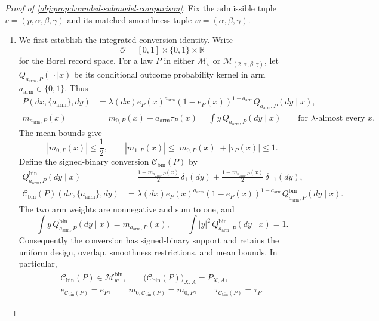 \documentclass[11pt]{article}
\begin{document}
\begin{proof}[Proof of \cref{obj:prop:bounded-submodel-comparison}]
Fix the admissible tuple \(v=(p,\alpha,\beta,\gamma)\) and its matched smoothness tuple \(w=(\alpha,\beta,\gamma)\).

\begin{enumerate}
\item We first establish the integrated conversion identity. Write
\[
\mathcal O=[0,1]\times\{0,1\}\times\mathbb R
\]
for the Borel record space. For a law \(P\) in either
\(\mathcal M_v\) or \(\mathcal M_{(2,\alpha,\beta,\gamma)}\), let
\(Q_{a_{\mathrm{arm}},P}(\,\cdot\mid x)\) be its conditional outcome probability kernel in arm \(a_{\mathrm{arm}}\in\{0,1\}\). Thus
\[
\begin{split}
P(dx,\{a_{\mathrm{arm}}\},dy)
&=\lambda(dx)e_P(x)^{a_{\mathrm{arm}}}
  (1-e_P(x))^{1-a_{\mathrm{arm}}}
  Q_{a_{\mathrm{arm}},P}(dy\mid x),\\
m_{a_{\mathrm{arm}},P}(x)
&=m_{0,P}(x)+a_{\mathrm{arm}}\tau_P(x)
 =\int y\,Q_{a_{\mathrm{arm}},P}(dy\mid x)
 \qquad\text{for \(\lambda\)-almost every \(x\)}.
\end{split}
\]
The mean bounds give
\[
|m_{0,P}(x)|\le\frac12,\qquad
|m_{1,P}(x)|
\le |m_{0,P}(x)|+|\tau_P(x)|\le1.
\]
Define the signed-binary conversion \(\mathcal C_{\mathrm{bin}}(P)\) by
\[
\begin{split}
Q^{\mathrm{bin}}_{a_{\mathrm{arm}},P}(dy\mid x)
&=\frac{1+m_{a_{\mathrm{arm}},P}(x)}2\,\delta_1(dy)
 +\frac{1-m_{a_{\mathrm{arm}},P}(x)}2\,\delta_{-1}(dy),\\
\mathcal C_{\mathrm{bin}}(P)(dx,\{a_{\mathrm{arm}}\},dy)
&=\lambda(dx)e_P(x)^{a_{\mathrm{arm}}}
 (1-e_P(x))^{1-a_{\mathrm{arm}}}
 Q^{\mathrm{bin}}_{a_{\mathrm{arm}},P}(dy\mid x).
\end{split}
\]
The two arm weights are nonnegative and sum to one, and
\[
\int y\,Q^{\mathrm{bin}}_{a_{\mathrm{arm}},P}(dy\mid x)
=m_{a_{\mathrm{arm}},P}(x),\qquad
\int |y|^2\,Q^{\mathrm{bin}}_{a_{\mathrm{arm}},P}(dy\mid x)=1.
\]
Consequently the conversion has signed-binary support and retains the uniform design, overlap, smoothness restrictions, and mean bounds. In particular,
\[
\begin{gathered}
\mathcal C_{\mathrm{bin}}(P)\in\mathcal M_w^{\mathrm{bin}},\qquad
\bigl(\mathcal C_{\mathrm{bin}}(P)\bigr)_{X,A}=P_{X,A},\\
e_{\mathcal C_{\mathrm{bin}}(P)}=e_P,\qquad
m_{0,\mathcal C_{\mathrm{bin}}(P)}=m_{0,P},\qquad
\tau_{\mathcal C_{\mathrm{bin}}(P)}=\tau_P.
\end{gathered}
\]
\end{enumerate}
\end{proof}
\end{document}
